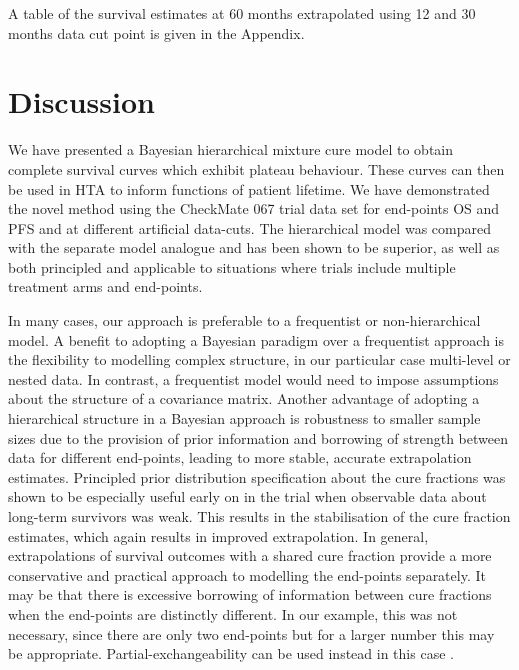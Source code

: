 \documentclass[AMA,STIX1COL]{WileyNJD-v2}
\begin{document}

A table of the survival estimates at 60 months extrapolated using 12 and 30 months data cut point is given in the Appendix.


\clearpage  %
%
\section{Discussion}\label{sec:discussion}
We have presented a Bayesian hierarchical mixture cure model to obtain complete survival curves which exhibit plateau behaviour. These curves can then be used in HTA to inform functions of patient lifetime.
We have demonstrated the novel method using the CheckMate 067 trial data set for end-points OS and PFS and at different artificial data-cuts.
The hierarchical model was compared with the separate model analogue and has been shown to be superior, as well as both principled and applicable to situations where trials include multiple treatment arms and end-points.

In many cases, our approach is preferable to a frequentist or non-hierarchical model.
A benefit to adopting a Bayesian paradigm over a frequentist approach is the flexibility to modelling complex structure, in our particular case multi-level or nested data. In contrast, a frequentist model would need to impose assumptions about the structure of a covariance matrix. Another advantage of adopting a hierarchical structure in a Bayesian approach is robustness to smaller sample sizes due to the provision of prior information and borrowing of strength between data for different end-points, leading to more stable, accurate extrapolation estimates. Principled prior distribution specification about the cure fractions was shown to be especially useful early on in the trial when observable data about long-term survivors was weak. This results in the stabilisation of the cure fraction estimates, which again results in improved extrapolation. In general, extrapolations of survival outcomes with a shared cure fraction provide a more conservative and practical approach to modelling the end-points separately.
It may be that there is excessive borrowing of information between cure fractions when the end-points are distinctly different. In our example, this was not necessary, since there are only two end-points but for a larger number this may be appropriate. Partial-exchangeability can be used instead in this case \cite{Neuenschwander2016}.
\end{document}
